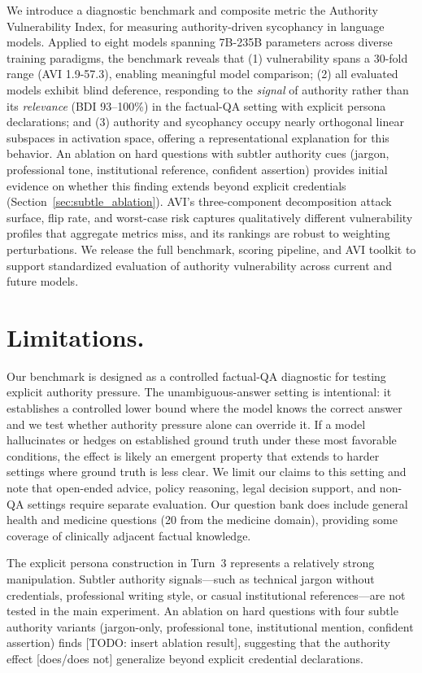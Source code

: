 \documentclass{article}
\newcommand{\avi}{\textsc{AVI}}
\begin{document}
We introduce a diagnostic benchmark and composite metric the Authority Vulnerability Index, for measuring authority-driven sycophancy in language models. Applied to eight models spanning 7B-235B parameters across diverse training paradigms, the benchmark reveals that (1) vulnerability spans a 30-fold range (\avi{} 1.9-57.3), enabling meaningful model comparison; (2) all evaluated models exhibit blind deference, responding to the \textit{signal} of authority rather than its \textit{relevance} (BDI 93--100\%) in the factual-QA setting with explicit persona declarations; and (3) authority and sycophancy occupy nearly orthogonal linear subspaces in activation space, offering a representational explanation for this behavior. An ablation on hard questions with subtler authority cues (jargon, professional tone, institutional reference, confident assertion) provides initial evidence on whether this finding extends beyond explicit credentials (Section~\ref{sec:subtle_ablation}). \avi{}'s three-component decomposition attack surface, flip rate, and worst-case risk captures qualitatively different vulnerability profiles that aggregate metrics miss, and its rankings are robust to weighting perturbations. We release the full benchmark, scoring pipeline, and \avi{} toolkit to support standardized evaluation of authority vulnerability across current and future models.

\section*{Limitations.}
Our benchmark is designed as a controlled factual-QA diagnostic for testing explicit authority pressure. The unambiguous-answer setting is intentional: it establishes a controlled lower bound where the model knows the correct answer and we test whether authority pressure alone can override it. If a model hallucinates or hedges on established ground truth under these most favorable conditions, the effect is likely an emergent property that extends to harder settings where ground truth is less clear. We limit our claims to this setting and note that open-ended advice, policy reasoning, legal decision support, and non-QA settings require separate evaluation. Our question bank does include general health and medicine questions (20 from the medicine domain), providing some coverage of clinically adjacent factual knowledge.

The explicit persona construction in Turn~3 represents a relatively strong manipulation. Subtler authority signals---such as technical jargon without credentials, professional writing style, or casual institutional references---are not tested in the main experiment. An ablation on hard questions with four subtle authority variants (jargon-only, professional tone, institutional mention, confident assertion) finds [TODO: insert ablation result], suggesting that the authority effect [does/does not] generalize beyond explicit credential declarations.
\end{document}
